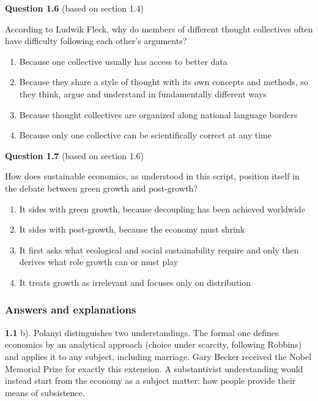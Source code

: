 \documentclass[
  british,
  a4paper,
  DIV=11,
  numbers=noendperiod,
  oneside,
  openany]{scrreprt}
\providecommand{\tightlist}{%
  \setlength{\itemsep}{0pt}\setlength{\parskip}{0pt}}
\begin{document}
\textbf{Question 1.6} (based on section 1.4)

According to Ludwik Fleck, why do members of different thought
collectives often have difficulty following each other's arguments?

\begin{enumerate}
\def\labelenumi{\alph{enumi})}
\tightlist
\item
  Because one collective usually has access to better data
\item
  Because they share a style of thought with its own concepts and
  methods, so they think, argue and understand in fundamentally
  different ways
\item
  Because thought collectives are organized along national language
  borders
\item
  Because only one collective can be scientifically correct at any time
\end{enumerate}

\textbf{Question 1.7} (based on section 1.6)

How does sustainable economics, as understood in this script, position
itself in the debate between green growth and post-growth?

\begin{enumerate}
\def\labelenumi{\alph{enumi})}
\tightlist
\item
  It sides with green growth, because decoupling has been achieved
  worldwide
\item
  It sides with post-growth, because the economy must shrink
\item
  It first asks what ecological and social sustainability require and
  only then derives what role growth can or must play
\item
  It treats growth as irrelevant and focuses only on distribution
\end{enumerate}

\subsubsection*{Answers and
explanations}\label{answers-and-explanations}

\textbf{1.1} b). Polanyi distinguishes two understandings. The formal
one defines economics by an analytical approach (choice under scarcity,
following Robbins) and applies it to any subject, including marriage.
Gary Becker received the Nobel Memorial Prize for exactly this
extension. A substantivist understanding would instead start from the
economy as a subject matter: how people provide their means of
subsistence.
\end{document}
